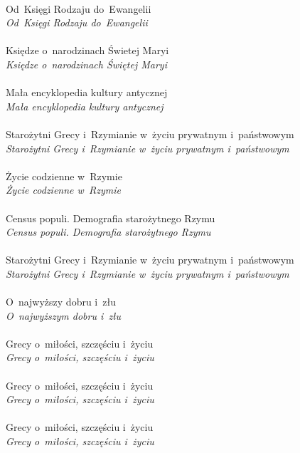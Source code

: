 \documentclass[a4paper,11pt]{article}
\begin{document}
 \\
\Jest  Od~Księgi Rodzaju do~Ewangelii \\
\Powin \emph{Od~Księgi Rodzaju do~Ewangelii} \\
 \\
\Jest  Księdze o~narodzinach Świetej Maryi \\
\Powin \emph{Księdze o~narodzinach Świętej Maryi} \\
 \\
\Jest  Mała encyklopedia kultury antycznej \\
\Powin \emph{Mała encyklopedia kultury antycznej} \\
 \\
\Jest  Starożytni Grecy i~Rzymianie w~życiu prywatnym i~państwowym \\
\Powin \emph{Starożytni Grecy i~Rzymianie w~życiu prywatnym i~państwowym} \\
 \\
\Jest  Życie codzienne w~Rzymie \\
\Powin \emph{Życie codzienne w~Rzymie} \\
 \\
\Jest  Census populi. Demografia starożytnego Rzymu \\
\Powin \emph{Census populi. Demografia starożytnego Rzymu} \\
 \\
\Jest  Starożytni Grecy i~Rzymianie w~życiu prywatnym i~państwowym \\
\Powin \emph{Starożytni Grecy i~Rzymianie w~życiu prywatnym
  i~państwowym} \\
 \\
\Jest  O~najwyższy dobru i~złu \\
\Powin \emph{O~najwyższym dobru i~złu} \\
 \\
\Jest  Grecy o~miłości, szczęściu i~życiu \\
\Powin \emph{Grecy o~miłości, szczęściu i~życiu} \\
 \\
\Jest  Grecy o~miłości, szczęściu i~życiu \\
\Powin \emph{Grecy o~miłości, szczęściu i~życiu} \\
 \\
\Jest  Grecy o~miłości, szczęściu i~życiu \\
\Powin \emph{Grecy o~miłości, szczęściu i~życiu} \\
\end{document}
